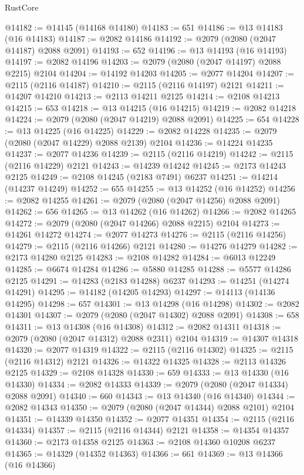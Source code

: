\begin{lexlean}{RustCore}
\begin{coremodule}
@14182 := @14145 (@14168 @14180)
@14183 := 651
@14186 := @13 @14183 (@16 @14183)
@14187 := @2082 @14186
@14192 := @2079 (@2080 (@2047 @14187) @2088 @2091)
@14193 := 652
@14196 := @13 @14193 (@16 @14193)
@14197 := @2082 @14196
@14203 := @2079 (@2080 (@2047 @14197) @2088 @2215) @2104
@14204 := @14192 @14203
@14205 := @2077 @14204
@14207 := @2115 (@2116 @14187)
@14210 := @2115 (@2116 @14197) @2121
@14211 := @14207 @14210
@14213 := @2113 @14211 @2125
@14214 := @2108 @14213
@14215 := 653
@14218 := @13 @14215 (@16 @14215)
@14219 := @2082 @14218
@14224 := @2079 (@2080 (@2047 @14219) @2088 @2091)
@14225 := 654
@14228 := @13 @14225 (@16 @14225)
@14229 := @2082 @14228
@14235 := @2079 (@2080 (@2047 @14229) @2088 @2139) @2104
@14236 := @14224 @14235
@14237 := @2077 @14236
@14239 := @2115 (@2116 @14219)
@14242 := @2115 (@2116 @14229) @2121
@14243 := @14239 @14242
@14245 := @2173 @14243 @2125
@14249 := @2108 @14245 (@2183 @7491) @6237
@14251 := @14214 (@14237 @14249)
@14252 := 655
@14255 := @13 @14252 (@16 @14252)
@14256 := @2082 @14255
@14261 := @2079 (@2080 (@2047 @14256) @2088 @2091)
@14262 := 656
@14265 := @13 @14262 (@16 @14262)
@14266 := @2082 @14265
@14272 := @2079 (@2080 (@2047 @14266) @2088 @2215) @2104
@14273 := @14261 @14272
@14274 := @2077 @14273
@14276 := @2115 (@2116 @14256)
@14279 := @2115 (@2116 @14266) @2121
@14280 := @14276 @14279
@14282 := @2173 @14280 @2125
@14283 := @2108 @14282
@14284 := @6013 @12249
@14285 := @6674 @14284
@14286 := @5880 @14285
@14288 := @5577 @14286 @2125
@14291 := @14283 (@2183 @14288) @6237
@14293 := @14251 (@14274 @14291)
@14295 := @14182 (@14205 @14293)
@14297 := @14113 (@14136 @14295)
@14298 := 657
@14301 := @13 @14298 (@16 @14298)
@14302 := @2082 @14301
@14307 := @2079 (@2080 (@2047 @14302) @2088 @2091)
@14308 := 658
@14311 := @13 @14308 (@16 @14308)
@14312 := @2082 @14311
@14318 := @2079 (@2080 (@2047 @14312) @2088 @2311) @2104
@14319 := @14307 @14318
@14320 := @2077 @14319
@14322 := @2115 (@2116 @14302)
@14325 := @2115 (@2116 @14312) @2121
@14326 := @14322 @14325
@14328 := @2113 @14326 @2125
@14329 := @2108 @14328
@14330 := 659
@14333 := @13 @14330 (@16 @14330)
@14334 := @2082 @14333
@14339 := @2079 (@2080 (@2047 @14334) @2088 @2091)
@14340 := 660
@14343 := @13 @14340 (@16 @14340)
@14344 := @2082 @14343
@14350 := @2079 (@2080 (@2047 @14344) @2088 @2101) @2104
@14351 := @14339 @14350
@14352 := @2077 @14351
@14354 := @2115 (@2116 @14334)
@14357 := @2115 (@2116 @14344) @2121
@14358 := @14354 @14357
@14360 := @2173 @14358 @2125
@14363 := @2108 @14360 @10208 @6237
@14365 := @14329 (@14352 @14363)
@14366 := 661
@14369 := @13 @14366 (@16 @14366)

\end{coremodule}
\end{lexlean}
